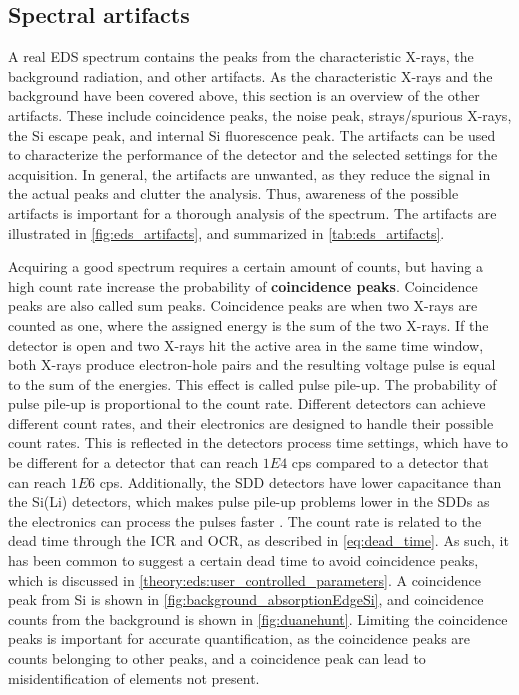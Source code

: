 

\clearpage


\subsection{Spectral artifacts}
\label{theory:eds:artifacts}



A real EDS spectrum contains the peaks from the characteristic X-rays, the background radiation, and other artifacts.
As the characteristic X-rays and the background have been covered above, this section is an overview of the other artifacts.
These include coincidence peaks, the noise peak, strays/spurious X-rays, the Si escape peak, and internal Si fluorescence peak.
The artifacts can be used to characterize the performance of the detector and the selected settings for the acquisition.
In general, the artifacts are unwanted, as they reduce the signal in the actual peaks and clutter the analysis.
Thus, awareness of the possible artifacts is important for a thorough analysis of the spectrum.
The artifacts are illustrated in \cref{fig:eds_artifacts}, and summarized in \cref{tab:eds_artifacts}.


Acquiring a good spectrum requires a certain amount of counts, but having a high count rate increase the probability of \textbf{coincidence peaks}.
Coincidence peaks are also called sum peaks.
Coincidence peaks are when two X-rays are counted as one, where the assigned energy is the sum of the two X-rays.
If the detector is open and two X-rays hit the active area in the same time window, both X-rays produce electron-hole pairs and the resulting voltage pulse is equal to the sum of the energies.
This effect is called pulse pile-up.
The probability of pulse pile-up is proportional to the count rate.
Different detectors can achieve different count rates, and their electronics are designed to handle their possible count rates.
This is reflected in the detectors process time settings, which have to be different for a detector that can reach $1E4$ cps compared to a detector that can reach $1E6$ cps.
Additionally, the SDD detectors have lower capacitance than the Si(Li) detectors, which makes pulse pile-up problems lower in the SDDs as the electronics can process the pulses faster \cite{astm_e1508_eds_quantification}.
The count rate is related to the dead time through the ICR and OCR, as described in \cref{eq:dead_time}.
As such, it has been common to suggest a certain dead time to avoid coincidence peaks, which is discussed in \cref{theory:eds:user_controlled_parameters}.
A coincidence peak from Si is shown in \cref{fig:background_absorptionEdgeSi}, and coincidence counts from the background is shown in \cref{fig:duanehunt}.
Limiting the coincidence peaks is important for accurate quantification, as the coincidence peaks are counts belonging to other peaks, and a coincidence peak can lead to misidentification of elements not present.



